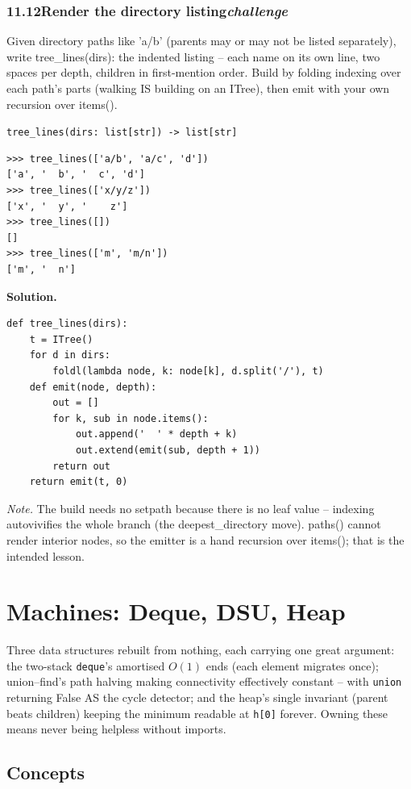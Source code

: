 \documentclass[10pt,letterpaper]{book}
\begin{document}
\subsection*{11.12\quad Render the directory listing\hfill\textnormal{\textit{challenge}}}
Given directory paths like 'a/b' (parents may or may not be listed separately), write tree\_lines(dirs): the indented listing -- each name on its own line, two spaces per depth, children in first-mention order. Build by folding indexing over each path's parts (walking IS building on an ITree), then emit with your own recursion over items().

\noindent\texttt{tree\_lines(dirs: list[str]) -> list[str]}
\begin{lstlisting}[style=ex]
>>> tree_lines(['a/b', 'a/c', 'd'])
['a', '  b', '  c', 'd']
>>> tree_lines(['x/y/z'])
['x', '  y', '    z']
>>> tree_lines([])
[]
>>> tree_lines(['m', 'm/n'])
['m', '  n']
\end{lstlisting}
\noindent\textbf{Solution.}
\begin{lstlisting}[style=code]
def tree_lines(dirs):
    t = ITree()
    for d in dirs:
        foldl(lambda node, k: node[k], d.split('/'), t)
    def emit(node, depth):
        out = []
        for k, sub in node.items():
            out.append('  ' * depth + k)
            out.extend(emit(sub, depth + 1))
        return out
    return emit(t, 0)
\end{lstlisting}
\noindent\textit{Note.} The build needs no setpath because there is no leaf value -- indexing autovivifies the whole branch (the deepest\_directory move). paths() cannot render interior nodes, so the emitter is a hand recursion over items(); that is the intended lesson.

\clearpage
\chapter{Machines: Deque, DSU, Heap}

Three data structures rebuilt from nothing, each carrying one great argument:
the two-stack \texttt{deque}'s amortised $O(1)$ ends (each element migrates
once); union--find's path halving making connectivity effectively constant
-- with \texttt{union} returning False AS the cycle detector; and the heap's
single invariant (parent beats children) keeping the minimum readable at
\texttt{h[0]} forever. Owning these means never being helpless without
imports.
\section{Concepts}
\end{document}
